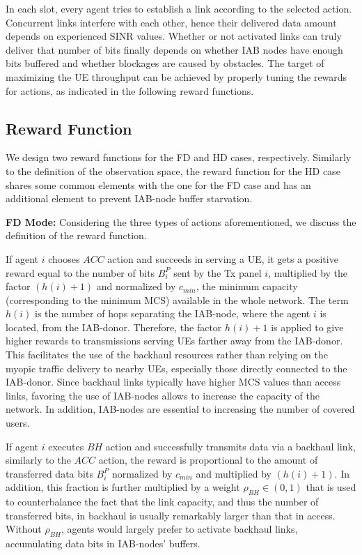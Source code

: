 In each slot, every agent tries to establish a link according to the selected action. Concurrent links interfere with each other, hence their delivered data amount depends on experienced SINR values. Whether or not activated links can truly deliver that number of bits finally depends on whether IAB nodes have enough bits buffered and whether blockages are caused by obstacles.
The target of maximizing the UE throughput can be achieved by properly tuning the rewards for actions, as indicated in the following reward functions.

\vspace{-12pt}
\subsection{Reward Function}

We design two reward functions for the FD and HD cases, respectively. Similarly to the definition of the observation space, the reward function for the HD case shares some common elements with the one for the FD case and has an additional element to prevent IAB-node buffer starvation.

\textbf{FD Mode:}
Considering the three types of actions aforementioned, we discuss the definition of the reward function.

If agent $i$ chooses $ACC$ action and succeeds in serving a UE, it gets a positive reward equal to the number of bits $B^P_i$ sent by the Tx panel $i$, multiplied by the factor $(h(i)+1)$ and normalized by $c_{min}$, the minimum capacity (corresponding to the minimum MCS) available in the whole network. The term $h(i)$ is the number of hops separating the IAB-node, where the agent $i$ is located, from the IAB-donor. Therefore, the factor $h(i)+1$ is applied to give higher rewards to transmissions serving UEs farther away from the IAB-donor. This facilitates the use of the backhaul resources rather than relying on the myopic traffic delivery to nearby UEs, especially those directly connected to the IAB-donor. Since backhaul links typically have higher MCS values than access links, favoring the use of IAB-nodes allows to increase the capacity of the network. In addition, IAB-nodes are essential to increasing the number of covered users.

If agent $i$ executes $BH$ action and successfully transmits data via a backhaul link, similarly to the $ACC$ action, the reward is proportional to the amount of transferred data bits $B^P_i$ normalized by $c_{min}$ and multiplied by $(h(i)+1)$. In addition, this fraction is further multiplied by a weight $\rho_{BH}\in(0,1)$ that is used to counterbalance the fact that the link capacity, and thus the number of transferred bits, in backhaul is usually remarkably larger than that in access. Without $\rho_{BH}$, agents would largely prefer to activate backhaul links, accumulating data bits in IAB-nodes' buffers.

